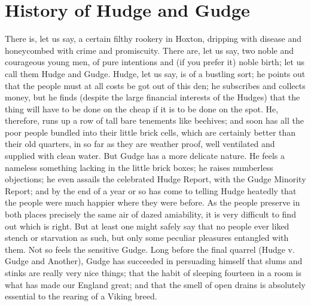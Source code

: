 \documentclass{book}
\begin{document}
\chapter{History of Hudge and Gudge}
\label{chapter-10}
There is, let us say, a certain filthy rookery in Hoxton, dripping with disease and honeycombed with crime and promiscuity. There are, let us say, two noble and courageous young men, of pure intentions and (if you prefer it) noble birth; let us call them Hudge and Gudge. Hudge, let us say, is of a bustling sort; he points out that the people must at all costs be got out of this den; he subscribes and collects money, but he finds (despite the large financial interests of the Hudges) that the thing will have to be done on the cheap if it is to be done on the spot. He, therefore, runs up a row of tall bare tenements like beehives; and soon has all the poor people bundled into their little brick cells, which are certainly better than their old quarters, in so far as they are weather proof, well ventilated and supplied with clean water. But Gudge has a more delicate nature. He feels a nameless something lacking in the little brick boxes; he raises numberless objections; he even assails the celebrated Hudge Report, with the Gudge Minority Report; and by the end of a year or so has come to telling Hudge heatedly that the people were much happier where they were before. As the people preserve in both places precisely the same air of dazed amiability, it is very difficult to find out which is right. But at least one might safely say that no people ever liked stench or starvation as such, but only some peculiar pleasures entangled with them. Not so feels the sensitive Gudge. Long before the final quarrel (Hudge v. Gudge and Another), Gudge has succeeded in persuading himself that slums and stinks are really very nice things; that the habit of sleeping fourteen in a room is what has made our England great; and that the smell of open drains is absolutely essential to the rearing of a Viking breed.
\end{document}
